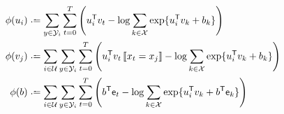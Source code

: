 \documentclass{article}
\def\e{\ensuremath{\mathsf{e}}}
\def\U{\ensuremath{\mathcal{U}}}
\begin{document}
\begin{align}
\phi(u_i) &\defeq   \sum_{y \in \Y_i} \sum_{t=0}^T \left( u_i\trans v_t - \log \sum_{k\in \X} \exp\{u_i\trans v_k + b_k\} \right)\\
\phi(v_j) &\defeq   \sum_{i \in \U} \sum_{y \in \Y_i} \sum_{t=0}^T \left( u_i\trans v_t \ind{x_t = x_j} - \log \sum_{k\in \X} \exp\{u_i\trans v_k + b_k\} \right)\\
\phi(b)   &\defeq   \sum_{i\in\U}\sum_{y\in\Y_i}\sum_{t=0}^T \left( b\trans \e_t - \log \sum_{k\in \X} \exp\{u_i\trans v_k + b\trans \e_k\} \right)
\end{align}
\end{document}
